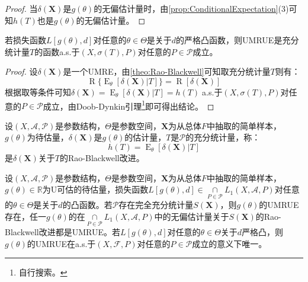 \begin{proof}
	当$\delta(\mathbf{X})$是$g(\theta)$的无偏估计量时，由\cref{prop:ConditionalExpectation}(3)可知$h(T)$也是$g(\theta)$的无偏估计量。
\end{proof}
\begin{corollary}\label{cor:Rao-Blackwell}
	若损失函数$L[g(\theta),d]$对任意的$\theta\in\Theta$是关于$d$的严格凸函数，则UMRUE是充分统计量$T$的函数a.s.于$(X,\sigma(T),P)$对任意的$P\in\mathscr{P}$成立。
\end{corollary}
\begin{proof}
	设$\delta(\mathbf{X})$是一个UMRE，由\cref{theo:Rao-Blackwell}可知取充分统计量$T$则有：
	\begin{equation*}
		\operatorname{R}\{\operatorname{E}_{\theta}[\delta(\mathbf{X})|T]\}=\operatorname{R}[\delta(\mathbf{X})]
	\end{equation*}
	根据取等条件可知$\delta(\mathbf{X})=\operatorname{E}_{\theta}[\delta(\mathbf{X})|T]=h(T)\;$a.s.于$(X,\sigma(T),P)$对任意的$P\in\mathscr{P}$成立，由Doob-Dynkin引理\footnote{自行搜索。}即可得出结论。
\end{proof}
\begin{definition}
	设$(X,\mathscr{A},\mathscr{P})$是参数结构，$\Theta$是参数空间，$\mathbf{X}$为从总体$F$中抽取的简单样本，$g(\theta)$为待估量，$\delta(\mathbf{X})$是$g(\theta)$的估计量，$T$是$\mathscr{P}$的充分统计量，称：
	\begin{equation*}
		h(T)=\operatorname{E}_{\theta}[\delta(\mathbf{X})|T]
	\end{equation*}
	是$\delta(\mathbf{X})$关于$T$的Rao-Blackwell改进。
\end{definition}
\begin{theorem}
	\label{theo:Lehmann-Scheffe}
	设$(X,\mathscr{A},\mathscr{P})$是参数结构，$\Theta$是参数空间，$\mathbf{X}$为从总体$F$中抽取的简单样本，$g(\theta)\in\mathbb{R}$为U可估的待估量，损失函数$L[g(\theta),d]\in\underset{P\in\mathscr{P}}{\cap}L_1(X,\mathscr{A},P)$对任意的$\theta\in\Theta$是关于$d$的凸函数。若$\mathscr{P}$存在完全充分统计量$S(\mathbf{X})$，则$g(\theta)$的UMRUE存在，任一$g(\theta)$的在$\underset{P\in\mathscr{P}}{\cap}L_1(X,\mathscr{A},P)$中的无偏估计量关于$S(\mathbf{X})$的Rao-Blackwell改进都是UMRUE。若$L[g(\theta),d]$对任意的$\theta\in\Theta$关于$d$严格凸，则$g(\theta)$的UMRUE在a.s.于$(X,\mathscr{F},P)$对任意的$P\in\mathscr{P}$成立的意义下唯一。
\end{theorem}
